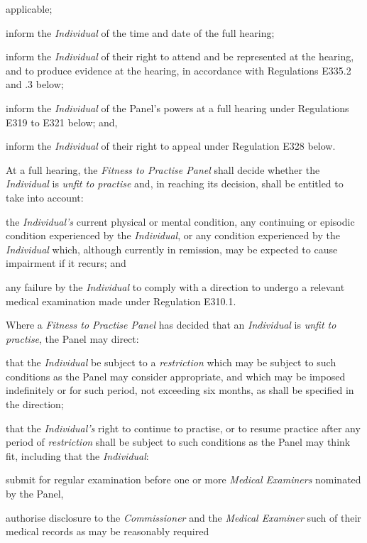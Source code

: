 applicable;\item inform the \emph{Individual} of the time and date of the full
hearing;\item inform the \emph{Individual} of their right to attend and be
represented at the hearing, and to produce evidence at the hearing, in
accordance with Regulations E335.2 and .3 below;\item inform the \emph{Individual} of the Panel's powers at a full hearing
under Regulations E319 to E321 below; and,\item inform the \emph{Individual} of their right to appeal under
Regulation E328 below.\ln
{}\par
{}
At a full hearing, the \emph{Fitness to Practise Panel} shall decide
whether the \emph{Individual} is \emph{unfit to practise} and, in
reaching its decision, shall be entitled to take into account:\\\nl \item the \emph{Individual's} current physical or mental condition, any
continuing or episodic condition experienced by the \emph{Individual},
or any condition experienced by the \emph{Individual} which, although
currently in remission, may be expected to cause impairment if it
recurs; and\item any failure by the \emph{Individual} to comply with a direction to
undergo a relevant medical examination made under Regulation E310.1.\ln
{}\par
Where a \emph{Fitness to Practise Panel} has decided that
an \emph{Individual} is \emph{unfit to practise}, the Panel may
direct:\\\nl \item that the \emph{Individual} be subject to a \emph{restriction} which
may be subject to such conditions as the Panel may consider appropriate,
and which may be imposed indefinitely or for such period, not exceeding
six months, as shall be specified in the direction;\item that the \emph{Individual's} right to continue to practise, or to
resume practice after any period of \emph{restriction} shall be subject
to such conditions as the Panel may think fit, including that
the \emph{Individual}:\al
\item  submit for regular examination before one or more \emph{Medical
Examiners} nominated by the Panel,\\
\item  authorise disclosure to the \emph{Commissioner} and the \emph{Medical
Examiner }such of their medical records as may be reasonably required
